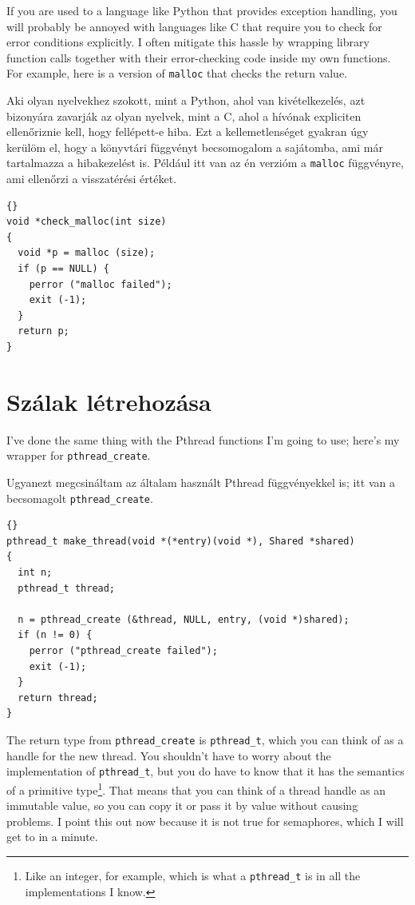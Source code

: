 \documentclass{book}
\begin{document}
If you are used to a language like Python that provides exception
handling, you will probably be annoyed with languages like C that
require you to check for error conditions explicitly.  I often
mitigate this hassle by wrapping library function calls
together with their error-checking code inside my own functions.
For example, here is a version of {\tt malloc}
that checks the return value.

Aki olyan nyelvekhez szokott, mint a Python, ahol van kivételkezelés,
azt bizonyára zavarják az olyan nyelvek, mint a C,
ahol a hívónak expliciten ellenőriznie kell, hogy fellépett-e hiba.
Ezt a kellemetlenséget gyakran úgy kerülöm el, hogy a könyvtári
függvényt becsomogalom a sajátomba, ami már tartalmazza a hibakezelést
is. Például itt van az én verzióm a {\tt malloc} függvényre, ami
ellenőrzi a visszatérési értéket.

\begin{lstlisting}[title={}]{}
void *check_malloc(int size)
{
  void *p = malloc (size);
  if (p == NULL) {
    perror ("malloc failed");
    exit (-1);
  }
  return p;
}
\end{lstlisting}


\section{Szálak létrehozása}

I've done the same thing with the Pthread functions I'm going to use;
here's my wrapper for {\tt pthread\_create}.

Ugyanezt megcsináltam az általam használt Pthread függvényekkel is;
itt van a becsomagolt {\tt pthread\_create}.

\begin{lstlisting}[title={}]{}
pthread_t make_thread(void *(*entry)(void *), Shared *shared)
{
  int n;
  pthread_t thread;

  n = pthread_create (&thread, NULL, entry, (void *)shared);
  if (n != 0) {
    perror ("pthread_create failed");
    exit (-1);
  }
  return thread;
}
\end{lstlisting}

The return type from {\tt pthread\_create} is {\tt pthread\_t},
which you can think of as a handle for the new thread.  You
shouldn't have to worry about the implementation of {\tt pthread\_t},
but you do have to know that it has the semantics of a primitive
type\footnote{Like an integer, for example, which is what a
{\tt pthread\_t} is in all the implementations I know.}.  That
means that you can think of a thread handle as an immutable
value, so you can copy it or pass it by value without causing
problems.  I point this out now because it is not true for
semaphores, which I will get to in a minute.
\end{document}
